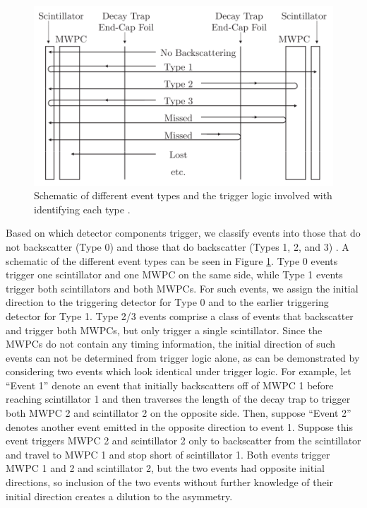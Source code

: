 \begin{figure}[h]
\centering
\includegraphics[scale=.4]{3-UCNAAnalysis/backscatterSchematic.png}
\caption{Schematic of different event types and the trigger logic involved with identifying
  each type \cite{plaster2012}.}
\label{fig:backscatterSchematic}
\end{figure}

Based on which detector components trigger, we classify events
into those that do not backscatter
(Type 0) and those that do backscatter (Types 1, 2, and 3) \cite{plaster2012}.
A schematic of the different event types can be seen in Figure \ref{fig:backscatterSchematic}.
Type 0 events
trigger one scintillator and one MWPC on the same side, while Type 1 events trigger
both scintillators and both MWPCs. For such events, we assign the initial
direction to the triggering detector for Type 0 and to the earlier triggering detector
for Type 1. Type 2/3 events comprise a class of events that backscatter and trigger both
MWPCs, but only trigger a single scintillator. Since the MWPCs do not contain any
timing information,
the initial direction of such events can
not be determined from trigger logic alone, as can be demonstrated by considering two events
which look identical under trigger logic.
For example, let ``Event 1'' denote an event that initially backscatters off
of MWPC 1 before reaching scintillator 1
and then traverses the length of the decay
trap to trigger both MWPC 2 and scintillator 2 on the opposite side.
Then, suppose ``Event 2'' denotes another event emitted
in the opposite direction to event 1. Suppose this event
triggers MWPC 2 and scintillator 2
only to backscatter from the scintillator and travel to MWPC 1 and stop short
of scintillator 1. Both events trigger MWPC 1 and 2 and scintillator 2,
but the two events had opposite initial directions, so inclusion of the
two events without further knowledge of their initial direction creates
a dilution to the asymmetry.

